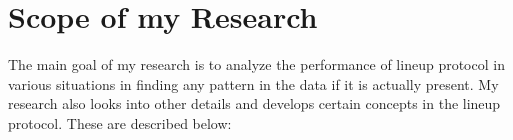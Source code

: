 


%

\section{Scope of my Research}

The main goal of my research is to analyze the performance of lineup protocol in various situations in finding any pattern in the data if it is actually present. My research also looks into other details and develops certain concepts in the lineup protocol. These are described below: \\

